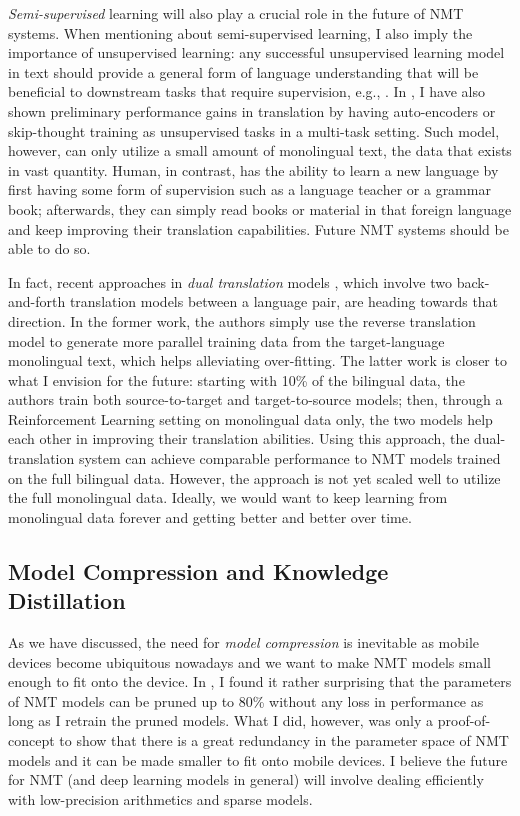 {\it Semi-supervised} learning will also play a crucial role in the future of NMT systems. When mentioning about semi-supervised learning, I also imply the importance of unsupervised learning: any successful unsupervised learning model in text should provide a general form of language understanding that will be beneficial to downstream tasks that require supervision, e.g., \cite{dai15}.
In , I have also shown preliminary performance gains in translation by having auto-encoders or skip-thought training as unsupervised tasks in a multi-task setting. Such model, however, can only utilize a small amount of monolingual text, the data that exists in vast quantity. Human, in contrast, has the ability to learn a new language by first having some form of supervision such as a language teacher or a grammar book; afterwards, they can simply read books or material in that foreign language and keep improving their translation capabilities. Future NMT systems should be able to do so. 

In fact, recent approaches in {\it dual translation} models \cite{sennrich16mono,xia16}, which involve two back-and-forth translation models between a language pair, are heading towards that direction. In the former work, the authors simply use the reverse translation model to generate more parallel training data from the target-language monolingual text, which helps alleviating over-fitting. The latter work is closer to what I envision for the future: starting with 10\% of the bilingual data, the authors train both source-to-target and target-to-source models; then, through a Reinforcement Learning setting on monolingual data only, the two models help each other in improving their translation abilities. Using this approach, the dual-translation system can achieve comparable performance to NMT models trained on the full bilingual data. However, the approach is not yet scaled well to utilize the full monolingual data. Ideally, we would want to keep learning from monolingual data forever and getting better and better over time.

\subsection{Model Compression and Knowledge Distillation}
As we have discussed, the need for {\it model compression} is inevitable as mobile devices become ubiquitous nowadays and we want to make NMT models small enough to fit onto the device. In , I found it rather surprising that the parameters of NMT models can be pruned up to 80\% without any loss in performance as long as I retrain the pruned models. What I did, however, was only a proof-of-concept to show that there is a great redundancy in the parameter space of NMT models and it can be made smaller to fit onto mobile devices. I believe the future for NMT (and deep learning models in general) will involve dealing efficiently with low-precision arithmetics \cite{courbariaux2015low,gupta15} and sparse models.

